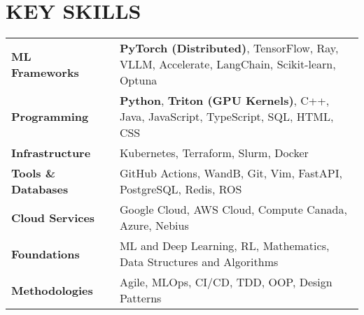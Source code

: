 \section{KEY SKILLS}
\begin{tabular}{ @{} >{\bfseries}l @{\hspace{6ex}} l }
ML Frameworks\ & \textbf{PyTorch (Distributed)}, TensorFlow, Ray, VLLM, Accelerate, LangChain, Scikit-learn, Optuna \\
Programming\ & \textbf{Python}, \textbf{Triton (GPU Kernels)}, C++, Java, JavaScript, TypeScript, SQL, HTML, CSS \\
Infrastructure \ & Kubernetes, Terraform, Slurm, Docker\\
Tools \& Databases\ & GitHub Actions, WandB, Git, Vim, FastAPI, PostgreSQL, Redis, ROS\\
Cloud Services\ & Google Cloud, AWS Cloud, Compute Canada, Azure, Nebius\\
Foundations \ & ML and Deep Learning, RL, Mathematics, Data Structures and Algorithms \\
Methodologies\ & Agile, MLOps, CI/CD, TDD, OOP, Design Patterns \\
\end{tabular}
